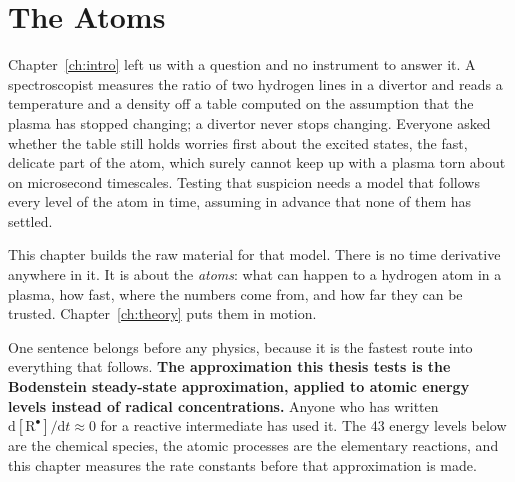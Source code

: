 %
%
%

\chapter{The Atoms}
\label{ch:atoms}

Chapter~\ref{ch:intro} left us with a question and no instrument to answer it. A
spectroscopist measures the ratio of two hydrogen lines in a divertor and reads a
temperature and a density off a table computed on the assumption that the plasma
has stopped changing; a divertor never stops changing. Everyone asked whether the
table still holds worries first about the excited states, the fast, delicate part
of the atom, which surely cannot keep up with a plasma torn about on microsecond
timescales. Testing that suspicion needs a model that follows every level of the
atom in time, assuming in advance that none of them has settled.

This chapter builds the raw material for that model. There is no time derivative
anywhere in it. It is about the \emph{atoms}: what can happen to a hydrogen atom
in a plasma, how fast, where the numbers come from, and how far they can be
trusted. Chapter~\ref{ch:theory} puts them in motion.

One sentence belongs before any physics, because it is the fastest route into
everything that follows. \textbf{The approximation this thesis tests
is the Bodenstein steady-state approximation, applied to atomic energy levels
instead of radical concentrations.} Anyone who has written
$\mathrm{d}[\mathrm{R}^{\bullet}]/\mathrm{d}t \approx 0$ for a reactive
intermediate has used it. The 43 energy levels below are the chemical species,
the atomic processes are the elementary reactions, and this chapter measures the
rate constants before that approximation is made.

